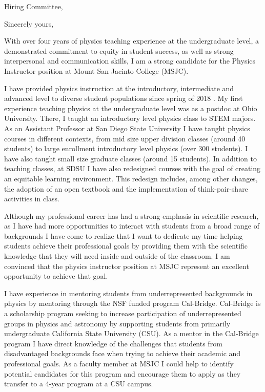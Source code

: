 
\date{\today}
\opening{Hiring Committee,}
\closing{Sincerely yours,}
\makelettertitle

With over four years of physics teaching experience at the undergraduate level, a demonstrated commitment to equity in student success, as well as strong interpersonal and communication skills, I am a strong candidate for the Physics Instructor position at Mount San Jacinto College (MSJC).

I have provided physics instruction at the introductory, intermediate and advanced level to diverse student populations since spring of 2018 . My first experience teaching physics at the undergraduate level was as a postdoc at Ohio University. There, I taught an introductory level physics class to STEM majors. As an Assistant Professor at San Diego State University I have taught physics courses in different contexts, from mid size upper division classes (around 40 students) to large enrollment introductory level physics (over 300 students). I have also taught small size graduate classes (around 15 students). In addition to teaching classes, at SDSU I have also redesigned courses with the goal of creating an equitable learning environment. This redesign includes, among other changes, the adoption of an open textbook and the implementation of think-pair-share activities in class.

Although my professional career has had a strong emphasis in scientific research, as I have had more opportunities to interact with students from a broad range of backgrounds I have come to realize that I want to dedicate my time helping students achieve their professional goals by providing them with the scientific knowledge that they will need inside and outside of the classroom. I am convinced that the physics instructor position at MSJC represent an excellent opportunity to achieve that goal.

I have experience in mentoring students from underrepresented backgrounds in physics by mentoring through the NSF funded program Cal-Bridge. Cal-Bridge is a scholarship program seeking to increase participation of underrepresented groups in physics and astronomy by supporting students from primarily undergraduate California State University (CSU). As a mentor in the Cal-Bridge program I have direct knowledge of the challenges that students from disadvantaged backgrounds face when trying to achieve their academic and professional goals. As a faculty member at MSJC I could help to identify potential candidates for this program and encourage them to apply as they transfer to a 4-year program at a CSU campus.

